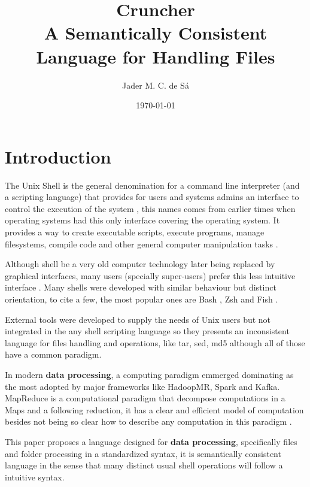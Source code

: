 \documentclass{article}
\title{Cruncher\\
\large A Semantically Consistent Language for Handling Files}
\author{Jader M. C. de Sá}
\date{\today}
\begin{document}
\maketitle

\section{Introduction}



The Unix Shell is the general denomination for a command line interpreter
(and a scripting language) that provides for users and systems admins an
interface to control the execution of the system \cite{negus2010linux},
this names comes from earlier times when operating systems had this only
interface covering the operating system. It provides a way to create
executable scripts, execute programs, manage filesystems, compile code and
other general computer manipulation tasks \cite{negus2010linux,blum2008linux}.

Although shell be a very old computer technology later being replaced by
graphical interfaces, many users (specially super-users) prefer this less
intuitive interface \cite{negus2010linux,newham2005learning}. Many shells were
developed with similar behaviour but distinct orientation, to cite a few, the
most popular ones are Bash \cite{bash}, Zsh \cite{zsh} and Fish \cite{fish}.

External tools were developed to supply the needs of Unix users
but not integrated in the any shell scripting language so they presents an
inconsistent language for files handling and operations, like tar, sed, md5
although all of those have a common paradigm.

In modern \textbf{data processing}, a computing paradigm emmerged dominating
as the most adopted by major frameworks like HadoopMR, Spark and Kafka.
MapReduce is a computational paradigm that decompose computations in a
Maps and a following reduction, it has a clear and efficient model of
computation besides not being so clear how to describe any computation in
this paradigm \cite{afrati2012vision}.

This paper proposes a language designed for \textbf{data processing},
specifically files and folder processing in a standardized syntax, it is
semantically consistent language in the sense that many distinct usual shell
operations will follow a intuitive syntax.
\end{document}
